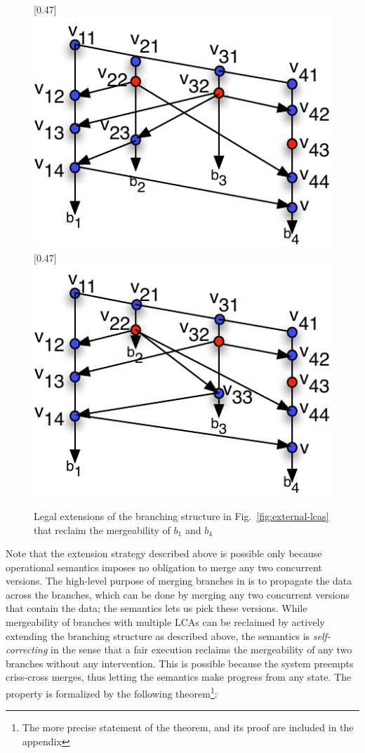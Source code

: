 \begin{figure}[!t]
\centering
{} [0.47\columnwidth] {
  \includegraphics[scale=0.8]{Figures/legal-extension-1}
}
\hfill
{} [0.47\columnwidth] {
  \includegraphics[scale=0.8]{Figures/legal-extension-2}
}
\caption{Legal extensions of the branching structure in
  Fig.~\ref{fig:external-lcas} that reclaim the mergeability of $b_1$
  and $b_4$}
\label{fig:legal-extensions}
\end{figure}


Note that the extension strategy described above is possible only
because operational semantics imposes no obligation to merge any two
concurrent versions. The high-level purpose of merging branches in
\name is to propagate the data across the branches, which can be done
by merging any two concurrent versions that contain the data; the
semantics lets us pick these versions. While mergeability of branches
with multiple LCAs can be reclaimed by actively extending the
branching structure as described above, the semantics is
\emph{self-correcting} in the sense that a fair execution reclaims the
mergeability of any two branches without any intervention. This is
possible because the system preempts criss-cross merges, thus letting
the semantics make progress from any state. The property is formalized
by the following theorem\footnote{The more precise statement of the
theorem, and its proof are included in the appendix}:

